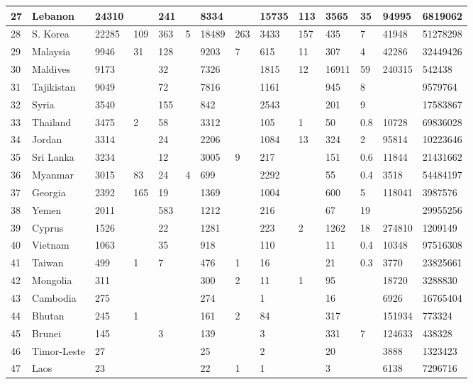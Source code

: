 \begin{landscape}
\begin{footnotesize}
\begin{longtable}{ | l | l | l | l | l | l | l | l | l | l | l | l | l | l | }
	27 & Lebanon & 24310 &  & 241 &  & 8334 &  & 15735 & 113 & 3565 & 35 & 94995 & 6819062 \\ \hline
	28 & S. Korea & 22285 & 109 & 363 & 5 & 18489 & 263 & 3433 & 157 & 435 & 7 & 41948 & 51278298 \\ \hline
	29 & Malaysia & 9946 & 31 & 128 &  & 9203 & 7 & 615 & 11 & 307 & 4 & 42286 & 32449426 \\ \hline
	30 & Maldives & 9173 &  & 32 &  & 7326 &  & 1815 & 12 & 16911 & 59 & 240315 & 542438 \\ \hline
	31 & Tajikistan & 9049 &  & 72 &  & 7816 &  & 1161 &  & 945 & 8 &  & 9579764 \\ \hline
	32 & Syria & 3540 &  & 155 &  & 842 &  & 2543 &  & 201 & 9 &  & 17583867 \\ \hline
	33 & Thailand & 3475 & 2 & 58 &  & 3312 &  & 105 & 1 & 50 & 0.8 & 10728 & 69836028 \\ \hline
	34 & Jordan & 3314 &  & 24 &  & 2206 &  & 1084 & 13 & 324 & 2 & 95814 & 10223646 \\ \hline
	35 & Sri Lanka & 3234 &  & 12 &  & 3005 & 9 & 217 &  & 151 & 0.6 & 11844 & 21431662 \\ \hline
	36 & Myanmar & 3015 & 83 & 24 & 4 & 699 &  & 2292 &  & 55 & 0.4 & 3518 & 54484197 \\ \hline
	37 & Georgia & 2392 & 165 & 19 &  & 1369 &  & 1004 &  & 600 & 5 & 118041 & 3987576 \\ \hline
	38 & Yemen & 2011 &  & 583 &  & 1212 &  & 216 &  & 67 & 19 &  & 29955256 \\ \hline
	39 & Cyprus & 1526 &  & 22 &  & 1281 &  & 223 & 2 & 1262 & 18 & 274810 & 1209149 \\ \hline
	40 & Vietnam & 1063 &  & 35 &  & 918 &  & 110 &  & 11 & 0.4 & 10348 & 97516308 \\ \hline
	41 & Taiwan & 499 & 1 & 7 &  & 476 & 1 & 16 &  & 21 & 0.3 & 3770 & 23825661 \\ \hline
	42 & Mongolia & 311 &  &  &  & 300 & 2 & 11 & 1 & 95 &  & 18720 & 3288830 \\ \hline
	43 & Cambodia & 275 &  &  &  & 274 &  & 1 &  & 16 &  & 6926 & 16765404 \\ \hline
	44 & Bhutan & 245 & 1 &  &  & 161 & 2 & 84 &  & 317 &  & 151934 & 773324 \\ \hline
	45 & Brunei & 145 &  & 3 &  & 139 &  & 3 &  & 331 & 7 & 124633 & 438328 \\ \hline
	46 & Timor-Leste & 27 &  &  &  & 25 &  & 2 &  & 20 &  & 3888 & 1323423 \\ \hline
	47 & Laos & 23 &  &  &  & 22 & 1 & 1 &  & 3 &  & 6138 & 7296716 \\ \hline
\end{longtable}
\end{footnotesize}
\end{landscape}

